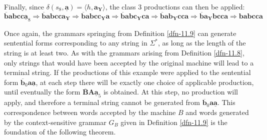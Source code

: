 \begin{center}
\end{center}
Finally, since $\delta(s_8,\underline{})=\langle h,\rangle$,
the class 3 productions can then be applied:
\[ \overline{\pmb{b}}\pmb{abcc}\underline{\pmb{a}}_8\Rightarrow\overline{\pmb{b}}\pmb{abcca_Y}
	\Rightarrow\overline{\pmb{b}}\pmb{abcc_Ya}\Rightarrow\overline{\pmb{b}}\pmb{abc_Yca}
	\Rightarrow\overline{\pmb{b}}\pmb{ab_Ycca}\Rightarrow\overline{\pmb{b}}\pmb{a_Ybcca}
	\Rightarrow\pmb{babcca} \]

Once again, the grammars springing from Definition \ref{dfn-11.9} can generate sentential
forms corresponding to any string in $\Sigma^*$, as long as the length of the
string is at least two. As with the grammars arising from Definition \ref{dfn-11.8}, only
strings that would have been accepted by the original machine will lead to a
terminal string. If the productions of this example were applied to the
sentential form $_0\underline{}$, at each step there
will be exactly one choice of applicable production, until eventually the form
$\underline{}_5$ is obtained. At this step, no production will
apply, and therefore a terminal string cannot be generated from $_0\underline{}$. This correspondence between words accepted by the
machine $B$ and words generated by the context-sensitive grammar $G_B$
given in Definition \ref{dfn-11.9} is the foundation of the following theorem.

